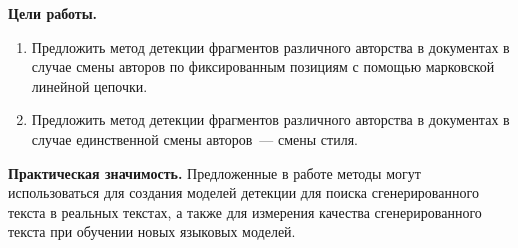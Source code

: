 \textbf{Цели работы.}
\begin{enumerate}
    \item Предложить метод детекции фрагментов различного авторства в документах в случае смены авторов по фиксированным позициям с помощью марковской линейной цепочки.
    \item Предложить метод детекции фрагментов различного авторства в документах в случае единственной смены авторов~--- смены стиля.
\end{enumerate}
\textbf{Практическая значимость.} Предложенные в работе методы могут использоваться для создания моделей детекции для поиска сгенерированного текста в реальных текстах, а также для измерения качества сгенерированного текста при обучении новых языковых моделей.




